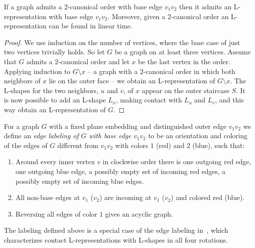 \documentclass{llncs}
\begin{document}
\begin{lemma}\label{lem:L-is-2-canonical}
If a graph admits a $2$-canonical order with base edge $v_1v_2$ then it admits an L-representation with base edge $v_1v_2$. Moreover, given a $2$-canonical order an L-representation can be found in linear time.
\end{lemma}
\begin{proof}
 We use induction on the number of vertices, where the base case of just two vertices trivially holds. So let $G$ be a graph on at least three vertices.
Assume that $G$ admits a $2$-canonical order and let $x$ be the last vertex in the order. Applying induction to $G \setminus x$ -- a graph with a $2$-canonical order in which both neighbors of $x$ lie on the outer face -- we obtain an L-representation of $G \setminus x$. The L-shapes for the two neighbors, $u$ and $v$, of $x$ appear on the outer staircase $S$. It is now possible to add an L-shape $L_x$, making contact with $L_u$ and $L_v$, and this way obtain an L-representation of $G$.
\end{proof}

For a graph $G$ with a fixed plane embedding and distinguished outer edge $v_1v_2$ we define an \emph{edge labeling of $G$ with base edge $v_1v_2$} to be an orientation and coloring of the edges of $G$ different from $v_1v_2$ with colors $1$ (red) and $2$ (blue), such that:
\begin{enumerate}[label = (\roman*)]
 \item Around every inner vertex $v$ in clockwise order there is one outgoing red edge, one outgoing blue edge, a possibly empty set of incoming red edges, a possibly empty set of incoming blue edges.
 \item All non-base edges at $v_1$ ($v_2$) are incoming at $v_1$ ($v_2$) and colored red (blue).\item Reversing all edges of color $1$ gives an acyclic graph.
\end{enumerate}

\noindent
The labeling defined above is a special case of the edge labeling in~\cite{full}, which characterizes contact L-representations with L-shapes in all four rotations.
\end{document}
